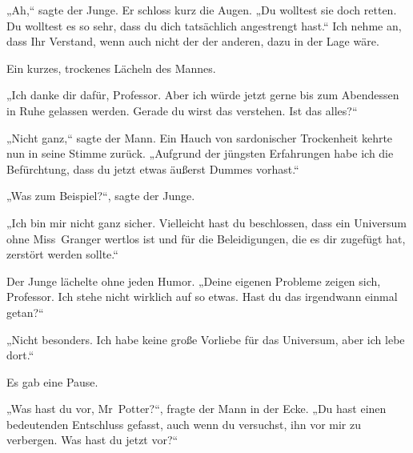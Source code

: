 „Ah,“ sagte der Junge.
Er schloss kurz die Augen.
„Du wolltest sie doch retten. Du wolltest es so sehr, dass du dich tatsächlich angestrengt hast.“ Ich nehme an, dass Ihr Verstand, wenn auch nicht der der anderen, dazu in der Lage wäre.

Ein kurzes, trockenes Lächeln des Mannes.

„Ich danke dir dafür, Professor. Aber ich würde jetzt gerne bis zum Abendessen in Ruhe gelassen werden. Gerade du wirst das verstehen. Ist das alles?“

„Nicht ganz,“ sagte der Mann.
Ein Hauch von sardonischer Trockenheit kehrte nun in seine Stimme zurück.
„Aufgrund der jüngsten Erfahrungen habe ich die Befürchtung, dass du jetzt etwas äußerst Dummes vorhast.“

„Was zum Beispiel?“, sagte der Junge.

„Ich bin mir nicht ganz sicher. Vielleicht hast du beschlossen, dass ein Universum ohne Miss~Granger wertlos ist und für die Beleidigungen, die es dir zugefügt hat, zerstört werden sollte.“

Der Junge lächelte ohne jeden Humor.
„Deine eigenen Probleme zeigen sich, Professor. Ich stehe nicht wirklich auf so etwas. Hast du das irgendwann einmal getan?“

„Nicht besonders. Ich habe keine große Vorliebe für das Universum, aber ich lebe dort.“

Es gab eine Pause.

„Was hast du vor, Mr~Potter?“, fragte der Mann in der Ecke. „Du hast einen bedeutenden Entschluss gefasst, auch wenn du versuchst, ihn vor mir zu verbergen. Was hast du jetzt vor?“


